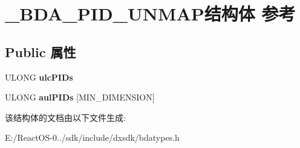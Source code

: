 \hypertarget{struct___b_d_a___p_i_d___u_n_m_a_p}{}\section{\+\_\+\+B\+D\+A\+\_\+\+P\+I\+D\+\_\+\+U\+N\+M\+A\+P结构体 参考}
\label{struct___b_d_a___p_i_d___u_n_m_a_p}
\subsection*{Public 属性}
\begin{DoxyCompactItemize}
\item 
\mbox{\label{struct___b_d_a___p_i_d___u_n_m_a_p_a669d7a35a5b1333269c1ae2fcad56eb8}} 
U\+L\+O\+NG {\bfseries ulc\+P\+I\+Ds}
\item 
\mbox{\label{struct___b_d_a___p_i_d___u_n_m_a_p_a4311689e6faf6a33d21111007b4a4369}} 
U\+L\+O\+NG {\bfseries aul\+P\+I\+Ds} \mbox{[}M\+I\+N\+\_\+\+D\+I\+M\+E\+N\+S\+I\+ON\mbox{]}
\end{DoxyCompactItemize}


该结构体的文档由以下文件生成\+:\begin{DoxyCompactItemize}
\item 
E\+:/\+React\+O\+S-\/0../sdk/include/dxsdk/bdatypes.\+h\end{DoxyCompactItemize}
